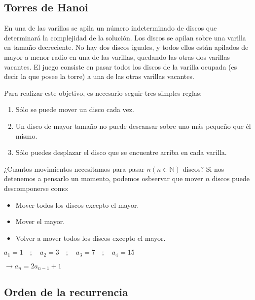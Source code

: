 \documentclass[a4paper, twoside]{article}
\begin{document}
	\subsection{Torres de Hanoi}
	En una de las varillas se apila un número indeterminado de discos que determinará la complejidad de la solución. 
	Los discos se apilan sobre una varilla en tamaño decreciente. No hay dos discos iguales, y todos ellos están apilados de mayor a menor radio en una de las varillas, quedando las otras dos varillas vacantes. 
	El juego consiste en pasar todos los discos de la varilla ocupada (es decir la que posee la torre) a una de las otras varillas vacantes. 
	
	Para realizar este objetivo, es necesario seguir tres simples reglas:
	\begin{enumerate}
	\item Sólo se puede mover un disco cada vez.
	\item Un disco de mayor tamaño no puede descansar sobre uno más pequeño que él mismo.
	\item Sólo puedes desplazar el disco que se encuentre arriba en cada varilla.									
	\end{enumerate}	
	
	¿Cuantos movimientos necesitamos para pasar $n (n \in \mathbb{N})$ discos?
	Si nos detenemos a pensarlo un momento, podemos osbservar que mover $n$ discos puede descomponerse como:
	
	\begin{itemize}
		\item Mover todos los discos excepto el mayor.
		\item Mover el mayor.
		\item Volver a mover todos los discos excepto el mayor.
	\end{itemize}	
	
	\vspace{0.25cm}
	$a_{1} = 1 \quad ; \quad a_{2} = 3 \quad ; \quad a_{3} = 7 \quad ; \quad a_{4} = 15$
	
	\begin{center}
		$\rightarrow a_{n} = 2 a_{n-1} + 1$
	\end{center}
	\subsection{Orden de la recurrencia}
	
	\begin{center}
		 \par
	\end{center}
\end{document}
